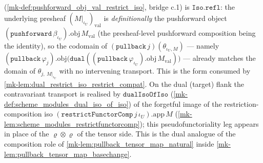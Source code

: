 \begin{lemma}
  (\ref{mk-def:pushforward_obj_val_restrict_iso}, bridge c.1) is \(\mathtt{Iso.refl}\): the underlying
  presheaf \((M|_{\iota_U})_{\mathrm{val}}\) is \emph{definitionally} the pushforward object
  \((\mathtt{pushforward}\,\beta_{\iota_U}).\mathrm{obj}\,M_{\mathrm{val}}\) (the presheaf-level pushforward
  composition being the identity), so the codomain of \((\mathtt{pullback}\,j)(\theta_{\iota_U, M})\)
  --- namely
  \((\mathtt{pullback}\,\varphi_j).\mathrm{obj}\bigl(\mathtt{dual}((\mathtt{pullback}\,\varphi_{\iota_U}).\mathrm{obj}\,M_{\mathrm{val}})\bigr)\)
  --- already matches the domain of \(\theta_{j,\ M|_{\iota_U}}\) with no intervening transport. This is
  the form consumed by \ref{mk-lem:dual_restrict_iso_restrict_compat}. On the dual (target) flank the
  contravariant transport is realised by \(\mathtt{dualIsoOfIso}\)
  (\ref{mk-def:scheme_modules_dual_iso_of_iso}) of the forgetful image of the restriction-composition iso
  \((\mathtt{restrictFunctorComp}\,j\,\iota_U).\mathrm{app}\,M\)
  (\ref{mk-lem:scheme_modules_restrictfunctorcomp}); this pseudofunctoriality leg appears in place of the
  \(\varrho \otimes \varrho\) of the tensor side. This is the dual analogue of the composition role of
  \ref{mk-lem:pullback_tensor_map_natural} inside \ref{mk-lem:pullback_tensor_map_basechange}.
\end{lemma}
